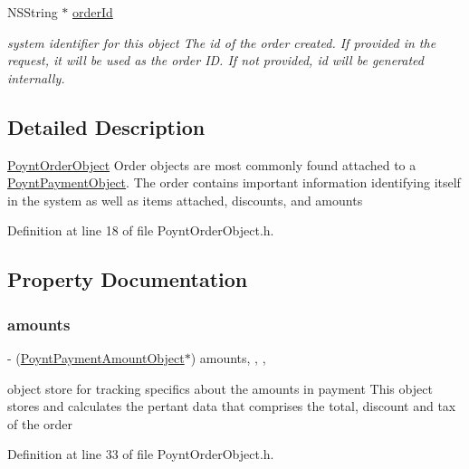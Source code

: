 \begin{DoxyCompactItemize}
N\+S\+String $\ast$ \hyperlink{interface_poynt_order_object_aac2b120e80b4b9e69c3a577c4f31ed31}{order\+Id}
\begin{DoxyCompactList}\small\item\em system identifier for this object  The id of the order created. If provided in the request, it will be used as the order ID. If not provided, id will be generated internally. \end{DoxyCompactList}\end{DoxyCompactItemize}


\subsection{Detailed Description}
\hyperlink{interface_poynt_order_object}{Poynt\+Order\+Object}  Order objects are most commonly found attached to a \hyperlink{interface_poynt_payment_object}{Poynt\+Payment\+Object}. The order contains important information identifying itself in the system as well as items attached, discounts, and amounts 

Definition at line 18 of file Poynt\+Order\+Object.\+h.



\subsection{Property Documentation}
\hypertarget{interface_poynt_order_object_a24782f14a239c62d29bf0389fb7fdf8d}{}\label{interface_poynt_order_object_a24782f14a239c62d29bf0389fb7fdf8d} 
\subsubsection{\texorpdfstring{amounts}{amounts}}
{\footnotesize\ttfamily -\/ (\hyperlink{interface_poynt_payment_amount_object}{Poynt\+Payment\+Amount\+Object}$\ast$) amounts\hspace{0.3cm}{\ttfamily [read]}, {\ttfamily [write]}, {\ttfamily [nonatomic]}, {\ttfamily [strong]}}



object store for tracking specifics about the amounts in payment  This object stores and calculates the pertant data that comprises the total, discount and tax of the order 



Definition at line 33 of file Poynt\+Order\+Object.\+h.

